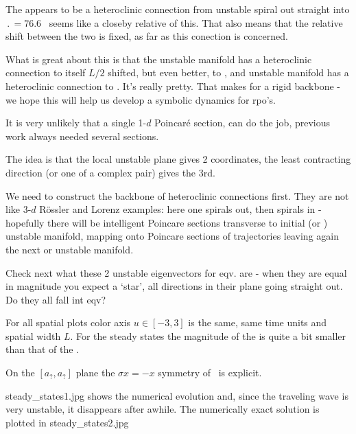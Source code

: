 The appears to be a heteroclinic connection from 
{\eqv}
unstable spiral out straight into  {\eqv}
$\period{} = 76.6$ \rpo\ seems like a closeby
relative of this.
That also means that the relative shift between the two {\eqva} is
fixed, as far as this conection is concerned.

What is great about
this is that the  unstable manifold has a heteroclinic connection to itself
$L/2$ shifted, but
even better, to , and  unstable manifold has a heteroclinic
connection to .
It's really pretty. That makes for a rigid backbone -
we hope this will help us develop a symbolic dynamics for rpo's.

It is very unlikely
that a single 1-$d$ Poincar\'e section,
can do the job,
previous work
always needed several sections.

The idea is that the local unstable plane gives 2 coordinates, the
least contracting direction (or one of a complex pair) gives the 3rd.

We need to construct the backbone of heteroclinic connections
first. They are not like 3-$d$ R\"ossler and Lorenz examples:
here one spirals out,
then spirals in - hopefully there will be intelligent Poincare sections
transverse to initial  (or ) unstable manifold, mapping onto
Poincare sections of trajectories leaving again
the next  or  unstable manifold.


Check next what these 2 unstable eigenvectors for  eqv. are - when they
are equal in magnitude you expect a `star', all directions in their plane
going straight out. Do they all fall int  eqv?

%

For all spatial plots color axis $u \in [-3, 3]$ is the same,
same time units and spatial width $L$.
For the steady states the magnitude of the  is quite
a bit smaller than that of the .

On the
    $[a_?,a_?]$ plane
    the $\sigma x = -x$ symmetry of \KSe\ is explicit.


steady\_states1.jpg shows the numerical evolution and, since the
traveling wave is very unstable, it disappears after awhile.
The numerically exact solution is plotted in steady\_states2.jpg

